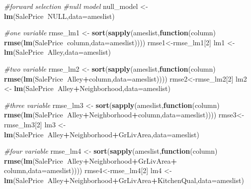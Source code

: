 \documentclass[]{article}
\newenvironment{Shaded}{\begin{snugshade}}{\end{snugshade}}
\newcommand{\CommentTok}[1]{\textcolor[rgb]{0.56,0.35,0.01}{\textit{#1}}}
\newcommand{\ControlFlowTok}[1]{\textcolor[rgb]{0.13,0.29,0.53}{\textbf{#1}}}
\newcommand{\DataTypeTok}[1]{\textcolor[rgb]{0.13,0.29,0.53}{#1}}
\newcommand{\DecValTok}[1]{\textcolor[rgb]{0.00,0.00,0.81}{#1}}
\newcommand{\KeywordTok}[1]{\textcolor[rgb]{0.13,0.29,0.53}{\textbf{#1}}}
\newcommand{\NormalTok}[1]{#1}
\newcommand{\OperatorTok}[1]{\textcolor[rgb]{0.81,0.36,0.00}{\textbf{#1}}}
\newcommand{\OtherTok}[1]{\textcolor[rgb]{0.56,0.35,0.01}{#1}}
\newcommand{\StringTok}[1]{\textcolor[rgb]{0.31,0.60,0.02}{#1}}
\begin{document}
\begin{Shaded}
\begin{Highlighting}[]
\CommentTok{#forward selection}
\CommentTok{#null model}
\NormalTok{null_model <-}\StringTok{ }\KeywordTok{lm}\NormalTok{(SalePrice}\OperatorTok{~}\OtherTok{NULL}\NormalTok{,}\DataTypeTok{data=}\NormalTok{ameslist)}

\CommentTok{#one variable}
\NormalTok{rmse_lm1 <-}\StringTok{ }\KeywordTok{sort}\NormalTok{(}\KeywordTok{sapply}\NormalTok{(ameslist,}\ControlFlowTok{function}\NormalTok{(column) }\KeywordTok{rmse}\NormalTok{(}\KeywordTok{lm}\NormalTok{(SalePrice}\OperatorTok{~}\NormalTok{column,}\DataTypeTok{data=}\NormalTok{ameslist))))}
\NormalTok{rmse1<-rmse_lm1[}\DecValTok{2}\NormalTok{]}
\NormalTok{lm1 <-}\KeywordTok{lm}\NormalTok{(SalePrice}\OperatorTok{~}\NormalTok{Alley,}\DataTypeTok{data=}\NormalTok{ameslist)}

\CommentTok{#two variable}
\NormalTok{rmse_lm2 <-}\StringTok{ }\KeywordTok{sort}\NormalTok{(}\KeywordTok{sapply}\NormalTok{(ameslist,}\ControlFlowTok{function}\NormalTok{(column) }\KeywordTok{rmse}\NormalTok{(}\KeywordTok{lm}\NormalTok{(SalePrice}\OperatorTok{~}\NormalTok{Alley}\OperatorTok{+}\NormalTok{column,}\DataTypeTok{data=}\NormalTok{ameslist))))}
\NormalTok{rmse2<-rmse_lm2[}\DecValTok{2}\NormalTok{]}
\NormalTok{lm2 <-}\StringTok{ }\KeywordTok{lm}\NormalTok{(SalePrice}\OperatorTok{~}\NormalTok{Alley}\OperatorTok{+}\NormalTok{Neighborhood,}\DataTypeTok{data=}\NormalTok{ameslist)}

\CommentTok{#three variable}
\NormalTok{rmse_lm3 <-}\StringTok{ }\KeywordTok{sort}\NormalTok{(}\KeywordTok{sapply}\NormalTok{(ameslist,}\ControlFlowTok{function}\NormalTok{(column) }\KeywordTok{rmse}\NormalTok{(}\KeywordTok{lm}\NormalTok{(SalePrice}\OperatorTok{~}\NormalTok{Alley}\OperatorTok{+}\NormalTok{Neighborhood}\OperatorTok{+}\NormalTok{column,}\DataTypeTok{data=}\NormalTok{ameslist))))}
\NormalTok{rmse3<-rmse_lm3[}\DecValTok{2}\NormalTok{]}
\NormalTok{lm3 <-}\KeywordTok{lm}\NormalTok{(SalePrice}\OperatorTok{~}\NormalTok{Alley}\OperatorTok{+}\NormalTok{Neighborhood}\OperatorTok{+}\NormalTok{GrLivArea,}\DataTypeTok{data=}\NormalTok{ameslist) }
  
\CommentTok{#four variable}
\NormalTok{rmse_lm4 <-}\StringTok{ }\KeywordTok{sort}\NormalTok{(}\KeywordTok{sapply}\NormalTok{(ameslist,}\ControlFlowTok{function}\NormalTok{(column) }\KeywordTok{rmse}\NormalTok{(}\KeywordTok{lm}\NormalTok{(SalePrice}\OperatorTok{~}\NormalTok{Alley}\OperatorTok{+}\NormalTok{Neighborhood}\OperatorTok{+}\NormalTok{GrLivArea}\OperatorTok{+}
\StringTok{                                                            }\NormalTok{column,}\DataTypeTok{data=}\NormalTok{ameslist))))}
\NormalTok{rmse4<-rmse_lm4[}\DecValTok{2}\NormalTok{]}
\NormalTok{lm4 <-}\KeywordTok{lm}\NormalTok{(SalePrice}\OperatorTok{~}\NormalTok{Alley}\OperatorTok{+}\NormalTok{Neighborhood}\OperatorTok{+}\NormalTok{GrLivArea}\OperatorTok{+}\NormalTok{KitchenQual,}\DataTypeTok{data=}\NormalTok{ameslist)}


\end{Highlighting}
\end{Shaded}
\end{document}
